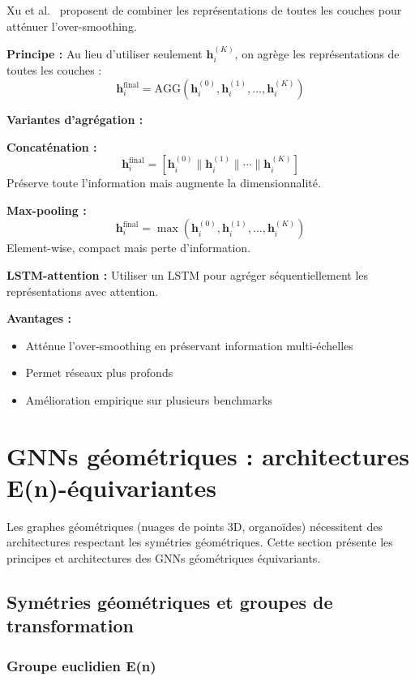 Xu et al.~\cite{Xu2018} proposent de combiner les représentations de toutes les couches pour atténuer l'over-smoothing.

\textbf{Principe :}
Au lieu d'utiliser seulement $\mathbf{h}_i^{(K)}$, on agrège les représentations de toutes les couches :
\[
\mathbf{h}_i^{\text{final}} = \text{AGG}\left(\mathbf{h}_i^{(0)}, \mathbf{h}_i^{(1)}, \ldots, \mathbf{h}_i^{(K)}\right)
\]

\textbf{Variantes d'agrégation :}

\textbf{Concaténation :}
\[
\mathbf{h}_i^{\text{final}} = [\mathbf{h}_i^{(0)} \| \mathbf{h}_i^{(1)} \| \cdots \| \mathbf{h}_i^{(K)}]
\]
Préserve toute l'information mais augmente la dimensionnalité.

\textbf{Max-pooling :}
\[
\mathbf{h}_i^{\text{final}} = \max\left(\mathbf{h}_i^{(0)}, \mathbf{h}_i^{(1)}, \ldots, \mathbf{h}_i^{(K)}\right)
\]
Element-wise, compact mais perte d'information.

\textbf{LSTM-attention :}
Utiliser un LSTM pour agréger séquentiellement les représentations avec attention.

\textbf{Avantages :}
\begin{itemize}
    \item Atténue l'over-smoothing en préservant information multi-échelles
    \item Permet réseaux plus profonds
    \item Amélioration empirique sur plusieurs benchmarks
\end{itemize}

\section{GNNs géométriques : architectures E(n)-équivariantes}

Les graphes géométriques (nuages de points 3D, organoïdes) nécessitent des architectures respectant les symétries géométriques. Cette section présente les principes et architectures des GNNs géométriques équivariants.

\subsection{Symétries géométriques et groupes de transformation}

\subsubsection{Groupe euclidien E(n)}

